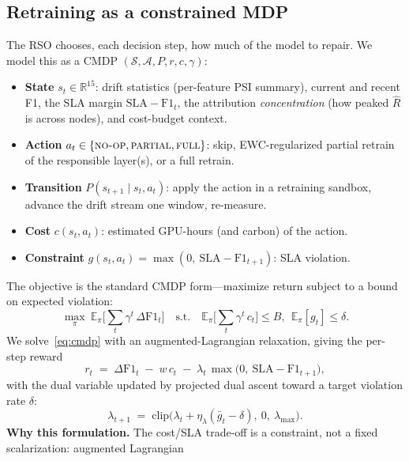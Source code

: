 \documentclass[conference]{IEEEtran}
\begin{document}
\subsection{Retraining as a constrained MDP}
The RSO chooses, each decision step, how much of the model to repair. We
model this as a CMDP $(\mathcal{S},\mathcal{A},P,r,c,\gamma)$:
\begin{itemize}
\item \textbf{State} $s_t\in\mathbb{R}^{15}$: drift statistics (per-feature
PSI summary), current and recent F1, the SLA margin $\mathrm{SLA}-\mathrm{F1}_t$,
the attribution \emph{concentration} (how peaked $\hat R$ is across nodes),
and cost-budget context.
\item \textbf{Action} $a_t\in\{\textsc{no-op},\textsc{partial},\textsc{full}\}$:
skip, EWC-regularized partial retrain of the responsible layer(s), or a
full retrain.
\item \textbf{Transition} $P(s_{t+1}\mid s_t,a_t)$: apply the action in a
retraining sandbox, advance the drift stream one window, re-measure.
\item \textbf{Cost} $c(s_t,a_t)$: estimated GPU-hours (and carbon) of the
action.
\item \textbf{Constraint} $g(s_t,a_t)=\max(0,\ \mathrm{SLA}-\mathrm{F1}_{t+1})$:
SLA violation.
\end{itemize}
The objective is the standard CMDP form---maximize return subject to a
bound on expected violation:
\begin{equation}
\max_{\pi}\ \mathbb{E}_\pi\!\Big[\textstyle\sum_t \gamma^t\,\Delta \mathrm{F1}_t\Big]
\quad\text{s.t.}\quad \mathbb{E}_\pi\!\Big[\textstyle\sum_t \gamma^t\,c_t\Big]\le B,\ \ \mathbb{E}_\pi[g_t]\le \delta .
\label{eq:cmdp}
\end{equation}
We solve~\eqref{eq:cmdp} with an augmented-Lagrangian relaxation, giving
the per-step reward
\begin{equation}
r_t \;=\; \Delta \mathrm{F1}_t \;-\; w\,c_t \;-\; \lambda_t\,\max\!\big(0,\ \mathrm{SLA}-\mathrm{F1}_{t+1}\big),
\label{eq:reward}
\end{equation}
with the dual variable updated by projected dual ascent toward a target
violation rate $\delta$:
\begin{equation}
\lambda_{t+1} \;=\; \mathrm{clip}\big(\lambda_t + \eta_\lambda(\bar g_t - \delta),\ 0,\ \lambda_{\max}\big).
\label{eq:dual}
\end{equation}
\textbf{Why this formulation.} The cost/SLA trade-off is a constraint, not
a fixed scalarization: augmented Lagrangian~\cite{bertsekas1996constrained}
\end{document}
